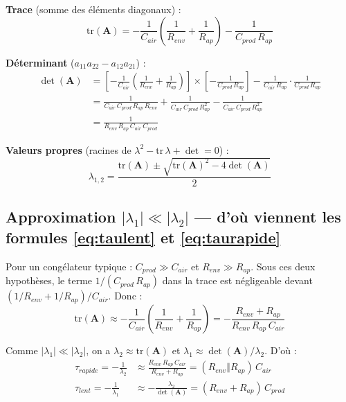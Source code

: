 \documentclass[11pt,a4paper]{article}
\begin{document}
\begin{demo}
\textbf{Trace} (somme des éléments diagonaux) :
\begin{equation}
\mathrm{tr}(\mathbf{A}) = -\frac{1}{C_{air}}\!\left(\frac{1}{R_{env}}+\frac{1}{R_{ap}}\right) - \frac{1}{C_{prod}\,R_{ap}}
\end{equation}

\textbf{Déterminant} ($a_{11}a_{22} - a_{12}a_{21}$) :
\begin{align*}
\det(\mathbf{A})
&= \left[-\frac{1}{C_{air}}\!\left(\frac{1}{R_{env}}+\frac{1}{R_{ap}}\right)\right]
   \times\left[-\frac{1}{C_{prod}\,R_{ap}}\right]
   - \frac{1}{C_{air}\,R_{ap}} \cdot \frac{1}{C_{prod}\,R_{ap}}\\
&= \frac{1}{C_{air}\,C_{prod}\,R_{ap}\,R_{env}}+ \frac{1}{C_{air}\,C_{prod}\,R_{ap}^2}
   - \frac{1}{C_{air}\,C_{prod}\,R_{ap}^2}\\
&= \frac{1}{R_{env}\,R_{ap}\,C_{air}\,C_{prod}}
\end{align*}

\textbf{Valeurs propres} (racines de $\lambda^2 - \mathrm{tr}\,\lambda + \det = 0$) :
\begin{equation}
\lambda_{1,2} = \frac{\mathrm{tr}(\mathbf{A}) \pm \sqrt{\mathrm{tr}(\mathbf{A})^2 - 4\det(\mathbf{A})}}{2}
\end{equation}
\end{demo}

\subsection{Approximation $|\lambda_1|\ll|\lambda_2|$ — d'où viennent les formules
\eqref{eq:taulent} et \eqref{eq:taurapide}}

Pour un congélateur typique : $C_{prod} \gg C_{air}$ et $R_{env} \gg R_{ap}$. Sous ces deux
hypothèses, le terme $1/(C_{prod}\,R_{ap})$ dans la trace est négligeable devant
$(1/R_{env}+1/R_{ap})/C_{air}$. Donc :
$$\mathrm{tr}(\mathbf{A}) \approx -\frac{1}{C_{air}}\!\left(\frac{1}{R_{env}}+\frac{1}{R_{ap}}\right)
= -\frac{R_{env}+R_{ap}}{R_{env}\,R_{ap}\,C_{air}}$$

Comme $|\lambda_1| \ll |\lambda_2|$, on a $\lambda_2 \approx \mathrm{tr}(\mathbf{A})$ et
$\lambda_1 \approx \det(\mathbf{A})/\lambda_2$. D'où :
\begin{align*}
\tau_{rapide} = -\frac{1}{\lambda_2} &\approx \frac{R_{env}\,R_{ap}\,C_{air}}{R_{env}+R_{ap}}
= (R_{env}\Vert R_{ap})\,C_{air}\\
\tau_{lent} = -\frac{1}{\lambda_1} &\approx -\frac{\lambda_2}{\det(\mathbf{A})}
= (R_{env}+R_{ap})\,C_{prod}
\end{align*}
\end{document}
